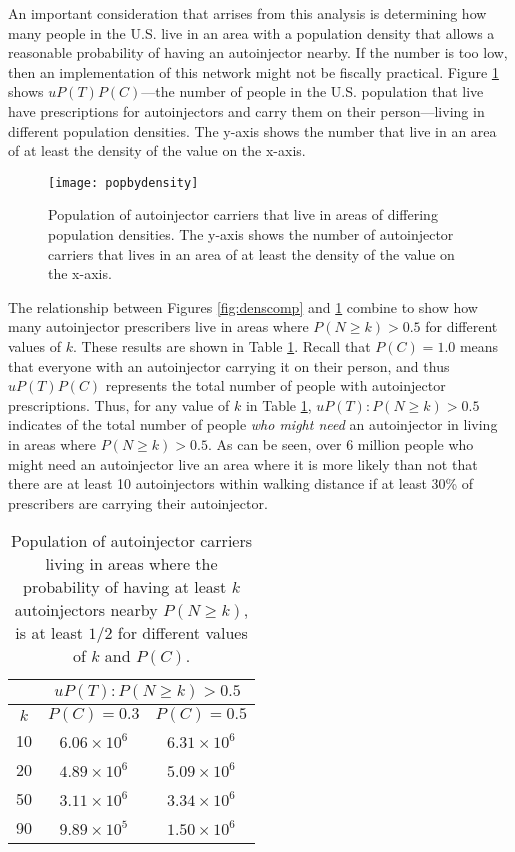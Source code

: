 An important consideration that arrises from this analysis is determining how many people in the U.S. live in an area with a population density that allows a reasonable probability of having an autoinjector nearby. If the number is too low, then an implementation of this network might not be fiscally practical. Figure \ref{fig:popbydensity} shows $uP(T)P(C)$---the number of people in the U.S. population that live have prescriptions for autoinjectors and carry them on their person---living in different population densities. The y-axis shows the number that live in an area of at least the density of the value on the x-axis.

\begin{figure}[h]
\centering
\texttt{[image: popbydensity]}
\caption{Population of autoinjector carriers that live in areas of differing population densities. The y-axis shows the number of autoinjector carriers that lives in an area of at least the density of the value on the x-axis.}
\label{fig:popbydensity}
\end{figure}

The relationship between Figures \ref{fig:denscomp} and \ref{fig:popbydensity} combine to show how many autoinjector prescribers live in areas where $P(N \geq k) > 0.5$ for different values of $k$. These results are shown in Table \ref{tab:probsforks}. Recall that $P(C) = 1.0$ means that everyone with an autoinjector carrying it on their person, and thus $uP(T)P(C)$ represents the total number of people with autoinjector prescriptions. Thus, for any value of $k$ in Table \ref{tab:probsforks}, $uP(T) : P(N\geq k) > 0.5$ indicates of the total number of people \textit{who might need} an autoinjector in living in areas where $P(N \geq k) > 0.5$. As can be seen, over 6 million people who might need an autoinjector live an area where it is more likely than not that there are at least 10 autoinjectors within walking distance if at least 30\% of prescribers are carrying their autoinjector.

\begin{table}[h]
\centering
\begin{tabular} {|c||c|c|}
    \hline
    & \multicolumn{2}{|c|}{$uP(T) : P(N\geq k) > 0.5$} \\\hline
    $k$ & $P(C) = 0.3$ & $P(C) = 0.5$ \\\hline\hline
    10 & $6.06 \times 10^{6}$ & $6.31 \times 10^{6}$ \\\hline
    20 & $4.89 \times 10^{6}$ & $5.09 \times 10^{6}$ \\\hline
    50 & $3.11 \times 10^{6}$ & $3.34 \times 10^{6}$ \\\hline
    90 & $9.89 \times 10^{5}$ & $1.50 \times 10^{6}$ \\\hline 
\end{tabular}
\caption{Population of autoinjector carriers living in areas where the probability of having at least $k$ autoinjectors nearby $P(N \geq k)$, is at least $1/2$ for different values of $k$ and $P(C)$.}
\label{tab:probsforks}
\end{table}

